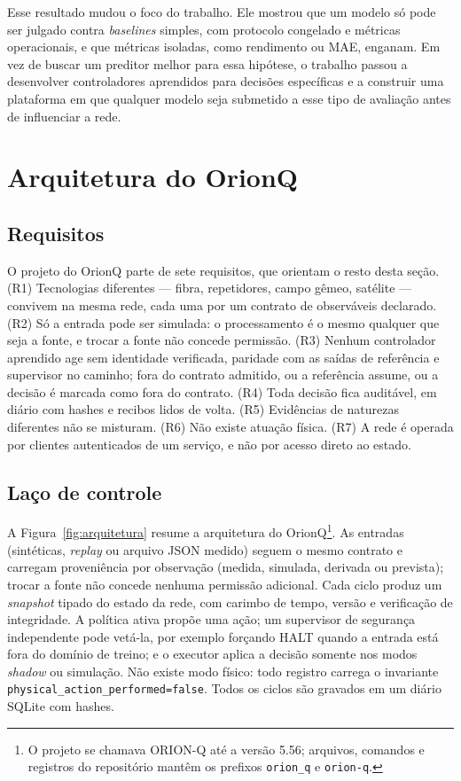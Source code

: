 \documentclass[12pt]{article}
\begin{document}
Esse resultado mudou o foco do trabalho. Ele mostrou que um modelo só pode ser
julgado contra \textit{baselines} simples, com protocolo congelado e métricas
operacionais, e que métricas isoladas, como rendimento ou MAE, enganam. Em vez de
buscar um preditor melhor para essa hipótese, o trabalho passou a desenvolver
controladores aprendidos para decisões específicas e a construir uma plataforma
em que qualquer modelo seja submetido a esse tipo de avaliação antes de
influenciar a rede.

\section{Arquitetura do OrionQ}
\label{sec:arquitetura}

\subsection{Requisitos}

O projeto do OrionQ parte de sete requisitos, que orientam o resto desta seção.
(R1) Tecnologias diferentes --- fibra, repetidores, campo gêmeo, satélite ---
convivem na mesma rede, cada uma por um contrato de observáveis declarado. (R2) Só a
entrada pode ser simulada: o processamento é o mesmo qualquer que seja a fonte,
e trocar a fonte não concede permissão. (R3) Nenhum controlador aprendido age
sem identidade verificada, paridade com as saídas de referência e supervisor no
caminho; fora do contrato admitido, ou a referência assume, ou a decisão é
marcada como fora do contrato. (R4) Toda decisão fica auditável, em diário
com hashes e recibos lidos de volta. (R5) Evidências de naturezas diferentes não
se misturam. (R6) Não existe atuação física. (R7) A rede é operada por clientes
autenticados de um serviço, e não por acesso direto ao estado.

\subsection{Laço de controle}

A Figura~\ref{fig:arquitetura} resume a arquitetura do OrionQ\footnote{O projeto
se chamava ORION-Q até a versão 5.56; arquivos, comandos e registros do
repositório mantêm os prefixos \texttt{orion\_q} e \texttt{orion-q}.}. As entradas (sintéticas,
\textit{replay} ou arquivo JSON medido) seguem o mesmo contrato e carregam
proveniência por observação (medida, simulada, derivada ou prevista); trocar a
fonte não concede nenhuma permissão adicional. Cada ciclo produz um
\textit{snapshot} tipado do estado da rede, com carimbo de tempo, versão e
verificação de integridade. A política ativa propõe uma ação; um supervisor de
segurança independente pode vetá-la, por exemplo forçando HALT quando a entrada
está fora do domínio de treino; e o executor aplica a decisão somente nos modos
\textit{shadow} ou simulação. Não existe modo físico: todo registro carrega o
invariante \texttt{physical\_action\_performed=false}. Todos os ciclos são
gravados em um diário SQLite com hashes.
\end{document}
